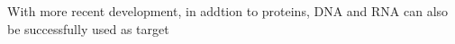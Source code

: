 With more recent development, in addtion to proteins, DNA and RNA can also be successfully used as target
